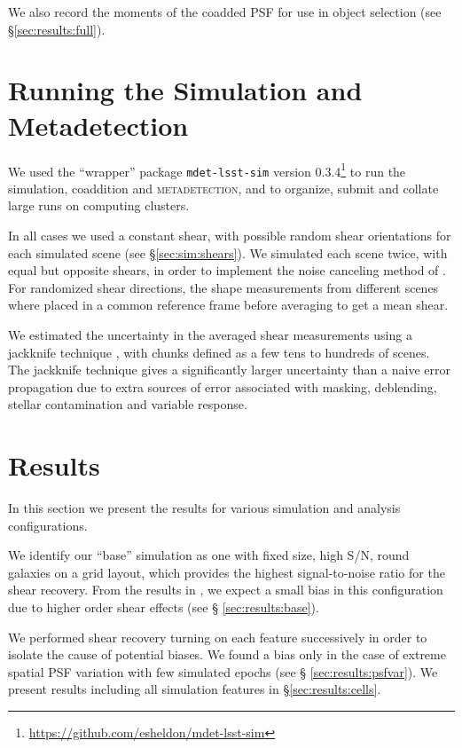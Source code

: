 \documentclass[twocolumn,twocolappendix,astrosym]{openjournal}
\newcommand{\mdet}{\textsc{metadetection}}
\begin{document}
We also record the moments of the coadded PSF for use in object selection (see
\S \ref{sec:results:full}).


\section{Running the Simulation and Metadetection} \label{sec:running}

We used the ``wrapper'' package \texttt{mdet-lsst-sim} version
0.3.4\footnote{\url{https://github.com/esheldon/mdet-lsst-sim}} to run the
simulation, coaddition and \mdet, and to organize, submit and collate large
runs on computing clusters.

In all cases we used a constant shear, with possible random shear orientations
for each simulated scene (see \S \ref{sec:sim:shears}).  We simulated each
scene twice, with equal but opposite shears, in order to implement the noise
canceling method of \cite{pujol2019}.  For randomized shear directions, the
shape measurements from different scenes where placed in a common reference
frame before averaging to get a mean shear.

We estimated the uncertainty in the averaged shear measurements using a
jackknife technique \citep{LuptonStats1993}, with chunks defined as a few tens
to hundreds of scenes.  The jackknife technique gives a significantly larger
uncertainty than a naive error propagation due to extra sources of error
associated with masking, deblending, stellar contamination and variable
response.

\section{Results} \label{sec:results}

In this section we present the results for various simulation and analysis
configurations.

We identify our ``base'' simulation as one with fixed size, high S/N, round
galaxies on a grid layout, which provides the highest signal-to-noise ratio for
the shear recovery. From the results in \citet{mdet20}, we expect a small bias
in this configuration due to higher order shear effects (see \S
\ref{sec:results:base}).

We performed shear recovery turning on each feature successively in order to
isolate the cause of potential biases.  We found a bias only in the case of
extreme spatial PSF variation with few simulated epochs (see \S
\ref{sec:results:psfvar}).  We present results including all simulation
features in \S \ref{sec:results:cells}.
\end{document}
